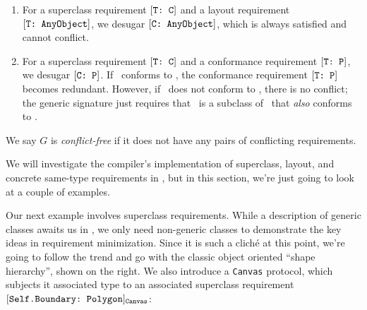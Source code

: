 \documentclass[../generics]{subfiles}
\begin{document}
\begin{definition}
\begin{enumerate}
\begin{enumerate}
\item If the two declarations are unrelated, we have a conflict.
\end{enumerate}
\item For a superclass requirement $[\texttt{T:~C}]$ and a layout requirement $[\texttt{T:~AnyObject}]$, we desugar $[\texttt{C:~AnyObject}]$, which is always satisfied and cannot conflict.
\item For a superclass requirement $[\texttt{T:~C}]$ and a conformance requirement $[\texttt{T:~P}]$, we desugar $[\texttt{C:~P}]$. If \tC\ conforms to \tP, the conformance requirement $[\texttt{T:~P}]$ becomes redundant. However, if \tC\ does not conform to \tP, there is no conflict; the generic signature just requires that \tT\ is a subclass of \tC\ that \emph{also} conforms to \tP.
\end{enumerate}
We say $G$ is \emph{conflict-free} if it does not have any pairs of conflicting requirements.
\end{definition}

We will investigate the compiler's implementation of superclass, layout, and concrete same-type requirements in , but in this section, we're just going to look at a couple of examples.

\smallskip

\begin{figure}
\quad{}
\end{figure}

Our next example involves superclass requirements. While a description of generic classes awaits us in , we only need non-generic classes to demonstrate the key ideas in requirement minimization. Since it is such a clich\'e at this point, we're going to follow the trend and go with the classic object oriented ``shape hierarchy'', shown on the right. We also introduce a \texttt{Canvas} protocol, which subjects it associated type to an associated superclass requirement $[\texttt{Self.Boundary:~Polygon}]_{\texttt{Canvas}}$:
\end{document}
